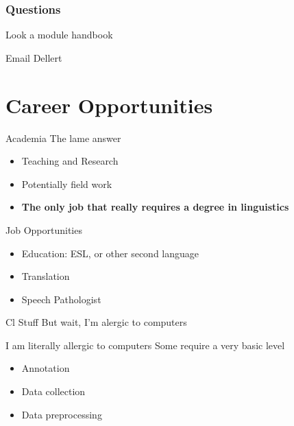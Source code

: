 \documentclass[aspectratio=169,hyperref={unicode}]{beamer}
\begin{document}
\begin{frame}[]
  \frametitle{Questions}
  \item Look a module handbook
  \item Email Dellert
\end{frame}
\section{Career Opportunities}


\begin{frame}{Academia}
The lame answer
  \begin{itemize}
    \item Teaching and Research
	\item Potentially field work 
    \item \textbf{The only job that really requires a degree in linguistics}

  \end{itemize}
\end{frame}

\begin{frame}{Job Opportunities}
  \begin{itemize}
    \item Education: ESL, or other second language
    \item Translation
    \item Speech Pathologist
  \end{itemize}
\end{frame}


\begin{frame}{Cl Stuff}
But wait, I'm alergic to computers
\end{frame}

\begin{frame}{I am literally allergic to computers}
Some require a very basic level
  \begin{itemize}
    \item Annotation
    \item Data collection
    \item Data preprocessing
  \end{itemize}
\end{frame}
\end{document}
